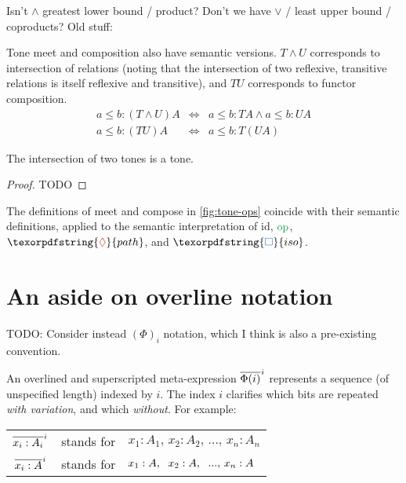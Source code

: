 \documentclass{rntz}
\newcommand{\todo}[1]{{\color{Purple}#1}}
\newcommand\opcolor{\color{ForestGreen}}
\newcommand\isocolor{\color{NavyBlue}}
\newcommand\pathcolor{\color{Bittersweet}}
\newcommand\id{\ensuremath{\mathrm{id}}}
\newcommand\op{\ensuremath{\mathrm{\opcolor op}}}
\newcommand\iso{\texorpdfstring{\ensuremath{{\isocolor\Box}}}{iso}}
\renewcommand\path{\texorpdfstring{\ensuremath{{\pathcolor\lozenge}}}{path}}
\newcommand\tmeet{\wedge}                  %
\begin{document}
\todo{Isn't $\tmeet$ greatest lower bound / product? Don't we have
  $\vee$ / least upper bound / coproducts? Old stuff:}

Tone meet and composition also have semantic versions. $T \tmeet U$ corresponds
to intersection of relations (noting that the intersection of two reflexive,
transitive relations is itself reflexive and transitive), and $TU$ corresponds
to functor composition.
%
\begin{eqnarray*}
  a \le b : (T \tmeet U)A %
  &\iff& a \le b : TA \wedge a \le b : UA\\
  a \le b : (TU)A &\iff& a \le b : T(UA)
\end{eqnarray*}

\begin{conjecture}
  The intersection of two tones is a tone.
\end{conjecture}
\begin{proof}
  \todo{TODO}
\end{proof}

\begin{conjecture}
  The definitions of meet and compose in \cref{fig:tone-ops} coincide with their
  semantic definitions, applied to the semantic interpretation of $\id$, $\op$,
  $\path$, and $\iso$.
\end{conjecture}


\section{An aside on overline notation}

\newcommand{\xbar}[2]{\overline{#2}^{\hspace{.5pt}#1}}

\newcommand{\Expr}{\Phi}
\newcommand{\Ix}[1]{#1}
\newcommand{\Ex}{{x}}
\newcommand{\Ay}{{A}}

\todo{TODO: Consider instead $\left(\Expr\right)_i$ notation, which I think is
  also a pre-existing convention.}

An overlined and superscripted meta-expression $\xbar{i}{\Expr(i)}$ represents a
sequence (of unspecified length) indexed by $i$. The index $i$ clarifies which
bits are repeated \emph{with variation}, and which \emph{without}. For example:

\begin{center}
  \begin{tabular}{ccl}
    $\xbar{\Ix{i}}{\Ex_{\Ix{i}} : \Ay_{\Ix{i}}}$
    & stands for
    & $\Ex_{\Ix{1}} : \Ay_{\Ix{1}},\, \Ex_{\Ix{2}} : \Ay_{\Ix{2}},\, ...,\, \Ex_{\Ix{n}} : \Ay_{\Ix{n}}$
    \vspace{.5em}\\
    $\xbar{\Ix{i}}{\Ex_{\Ix{i}} : \Ay}$
    & stands for
    & $\Ex_{\Ix{1}} : \Ay,\hspace{0.6em} \Ex_{\Ix{2}} : \Ay,\hspace{0.6em} ...,\, \Ex_{\Ix{n}} : \Ay$
  \end{tabular}
\end{center}
\end{document}

